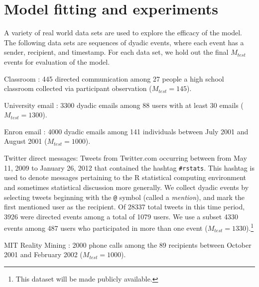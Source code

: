 \section{Model fitting and experiments}
\label{sec:experiments}


A variety of real world data sets are used to explore the efficacy of the model.  The following data sets are sequences of dyadic events, where each event has a sender, recipient, and timestamp.  For each data set, we hold out the final $M_{test}$ events for evaluation of the model.
\begin{list}{}{\leftmargin=1em}
\item Classroom \cite{McFarland2001}: 445 directed communication among 27 people a high
  school classroom collected via participant observation ($M_{test}= 145$).
\item University email \cite{Eckmann2004}: 3300 dyadic emails among 88
  users with at least 30 emails ($M_{test} = 1300$).
\item Enron email \cite{Klimt2004}: 4000 dyadic emails among 141
  individuals between July 2001 and August 2001 ($M_{test} = 1000$).
\item Twitter direct messages: Tweets from Twitter.com occurring between from May 11, 2009 to January 26, 2012 that contained the hashtag \texttt{\#rstats}.  This hashtag is used to denote messages pertaining to the R statistical computing environment and sometimes statistical discussion more generally.  We collect dyadic events by selecting tweets beginning with the \texttt{@} symbol (called a \emph{mention}), and mark the first mentioned user as the recipient.
Of 28337 total tweets in this time period, 3926 were directed events among a total of 1079 users.
We use a subset 4330 events among 487 users who participated in more than one event ($M_{test} = 1330$).\footnote{This dataset will be made publicly available.}
\item MIT Reality Mining \cite{Eagle2009}: 2000 phone calls among the
  89 recipients between October 2001 and February 2002 ($M_{test}= 1000$).
\end{list}


